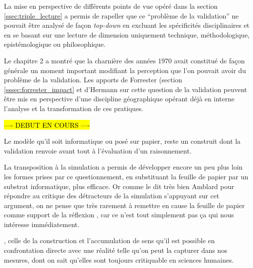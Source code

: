 La mise en perspective de différents points de vue opéré dans la section \ref{ssec:triple_lecture} a permis de rapeller que ce \enquote{problème de la validation} ne pouvait être analysé de façon \textit{top-down} en excluant les spécificités disciplinaires et en se basant sur une lecture de dimension uniquement technique, méthodologique, epistémologique ou philosophique. 


Le chapitre 2 a montré que la charnière des années 1970 avait constitué de façon générale un moment important modifiant la perception que l'on pouvait avoir du problème de la validation. Les apports de Forrester (section \ref{sssec:forrester_impact} et d'Hermann sur cette question de la validation peuvent être mis en perspective d'une discipline géographique opérant déjà en interne l'analyse et la transformation de ces pratiques. 

\hl{ ---- DEBUT EN COURS ---- }

Le modèle qu'il soit informatique ou posé sur papier, reste un construit dont la validation renvoie avant tout à l'évaluation d'un raisonnement. 


La transposition à la simulation a permis de développer encore un peu plus loin les formes prises par ce questionnement, en substituant la feuille de papier par un substrat informatique, plus efficace. Or comme le dit très bien Amblard pour répondre au critique des détracteurs de la simulation s'appuyant sur cet argument, on ne pense que très rarement à remettre en cause la feuille de papier comme support de la réflexion , car ce n'est tout simplement pas ça qui nous intéresse immédiatement. 

, celle de la construction et l'accumulation de sens qu'il est possible en confrontation directe avec une réalité telle qu'on peut la capturer dans nos mesures, dont on sait qu'elles sont toujours critiquable en sciences humaines. 


